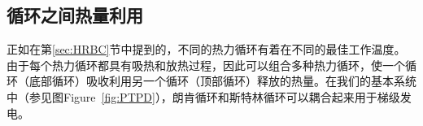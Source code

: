 \subsection{循环之间热量利用}
正如在第\ref{sec:HRBC}节中提到的，不同的热力循环有着在不同的最佳工作温度。由于每个热力循环都具有吸热和放热过程，因此可以组合多种热力循环，使一个循环（底部循环）吸收利用另一个循环（顶部循环）释放的热量。在我们的基本系统中（参见图Figure~\ref{fig:PTPD}），朗肯循环和斯特林循环可以耦合起来用于梯级发电。


